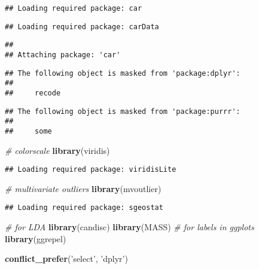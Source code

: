 \documentclass[12pt,]{article}
\newenvironment{Shaded}{\begin{snugshade}}{\end{snugshade}}
\newcommand{\CommentTok}[1]{\textcolor[rgb]{0.56,0.35,0.01}{\textit{#1}}}
\newcommand{\KeywordTok}[1]{\textcolor[rgb]{0.13,0.29,0.53}{\textbf{#1}}}
\newcommand{\NormalTok}[1]{#1}
\newcommand{\StringTok}[1]{\textcolor[rgb]{0.31,0.60,0.02}{#1}}
\begin{document}
\begin{verbatim}
## Loading required package: car
\end{verbatim}

\begin{verbatim}
## Loading required package: carData
\end{verbatim}

\begin{verbatim}
## 
## Attaching package: 'car'
\end{verbatim}

\begin{verbatim}
## The following object is masked from 'package:dplyr':
## 
##     recode
\end{verbatim}

\begin{verbatim}
## The following object is masked from 'package:purrr':
## 
##     some
\end{verbatim}

\begin{Shaded}
\begin{Highlighting}[]
\CommentTok{# colorscale}
\KeywordTok{library}\NormalTok{(viridis)}
\end{Highlighting}
\end{Shaded}

\begin{verbatim}
## Loading required package: viridisLite
\end{verbatim}

\begin{Shaded}
\begin{Highlighting}[]
\CommentTok{# multivariate outliers}
\KeywordTok{library}\NormalTok{(mvoutlier)}
\end{Highlighting}
\end{Shaded}

\begin{verbatim}
## Loading required package: sgeostat
\end{verbatim}

\begin{Shaded}
\begin{Highlighting}[]
\CommentTok{# for LDA}
\KeywordTok{library}\NormalTok{(candisc)}
\KeywordTok{library}\NormalTok{(MASS)}
\CommentTok{# for labels in ggplots}
\KeywordTok{library}\NormalTok{(ggrepel)}

\KeywordTok{conflict_prefer}\NormalTok{(}\StringTok{'select'}\NormalTok{, }\StringTok{'dplyr'}\NormalTok{)}
\end{Highlighting}
\end{Shaded}
\end{document}
